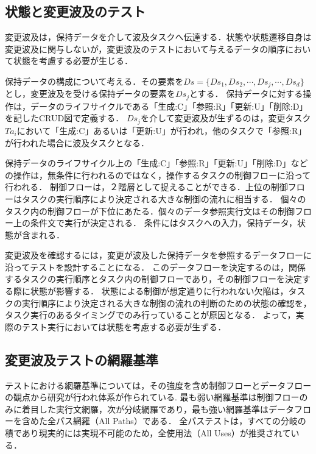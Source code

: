 \documentclass[a4paper,12pt]{jreport}
\begin{document}
\subsection{状態と変更波及のテスト}
変更波及は，保持データを介して波及タスクへ伝達する．状態や状態遷移自身は変更波及に関与しないが，変更波及のテストにおいて与えるデータの順序において状態を考慮する必要が生じる．

保持データの構成について考える．その要素を$Ds=\{Ds_1,Ds_2,\cdots,Ds_j,\cdots,Ds_d\}$とし，変更波及を受ける保持データの要素を$Ds_j$とする．
保持データに対する操作は，データのライフサイクルである「生成:C」「参照:R」「更新:U」「削除:D」を記したCRUD図で定義する．
$Ds_j$を介して変更波及が生ずるのは，変更タスク$Ta_i$において「生成:C」あるいは「更新:U」が行われ，他のタスクで「参照:R」が行われた場合に波及タスクとなる．

保持データのライフサイクル上の「生成:C」「参照:R」「更新:U」「削除:D」などの操作は，無条件に行われるのではなく，操作するタスクの制御フローに沿って行われる．
制御フローは，２階層として捉えることができる．上位の制御フローはタスクの実行順序により決定される大きな制御の流れに相当する．
個々のタスク内の制御フローが下位にあたる．個々のデータ参照実行文はその制御フロー上の条件文で実行が決定される．
条件にはタスクへの入力，保持データ，状態が含まれる．

変更波及を確認するには，変更が波及した保持データを参照するデータフローに沿ってテストを設計することになる．
このデータフローを決定するのは，関係するタスクの実行順序とタスク内の制御フローであり，その制御フローを決定する際に状態が影響する．
状態による制御が想定通りに行われない欠陥は，タスクの実行順序により決定される大きな制御の流れの判断のための状態の確認を，タスク実行のあるタイミングでのみ行っていることが原因となる．%
よって，実際のテスト実行においては状態を考慮する必要が生ずる．

\subsection{変更波及テストの網羅基準}

テストにおける網羅基準については，その強度を含め制御フローとデータフローの観点から研究が行われ体系が作られている\cite{beiz90}.
最も弱い網羅基準は制御フローのみに着目した実行文網羅，次が分岐網羅であり，最も強い網羅基準はデータフローを含めた全パス網羅（All Paths）である．%
全パステストは，すべての分岐の積であり現実的には実現不可能のため，全使用法（All Uses）が推奨されている\cite{beiz90}．
\end{document}
